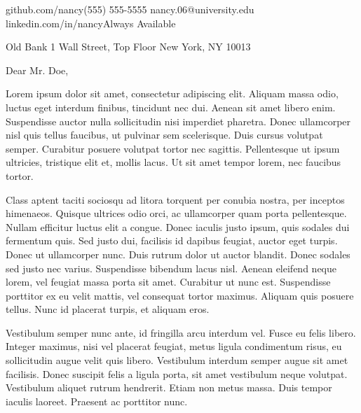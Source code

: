 \documentclass{practical-cover-letter}
\begin{document}
\namehead

\address{nancy.com}{github.com/nancy}{(555) 555-5555}{ nancy.06@university.edu }{linkedin.com/in/nancy}{Always Available}
%
%
\hfill

\begin{changemargin}{.7in}{.7in} 
\employerdate{\today}

\begin{changemargin}{.3in}{.3in} 
{Old Bank}
{1 Wall Street, Top Floor}
{New York, NY 10013}
\end{changemargin}


Dear Mr. Doe,

Lorem ipsum dolor sit amet, consectetur adipiscing elit. Aliquam massa odio, luctus eget interdum finibus, tincidunt nec dui. Aenean sit amet libero enim. Suspendisse auctor nulla sollicitudin nisi imperdiet pharetra. Donec ullamcorper nisl quis tellus faucibus, ut pulvinar sem scelerisque. Duis cursus volutpat semper. Curabitur posuere volutpat tortor nec sagittis. Pellentesque ut ipsum ultricies, tristique elit et, mollis lacus. Ut sit amet tempor lorem, nec faucibus tortor.

Class aptent taciti sociosqu ad litora torquent per conubia nostra, per inceptos himenaeos. Quisque ultrices odio orci, ac ullamcorper quam porta pellentesque. Nullam efficitur luctus elit a congue. Donec iaculis justo ipsum, quis sodales dui fermentum quis. Sed justo dui, facilisis id dapibus feugiat, auctor eget turpis. Donec ut ullamcorper nunc. Duis rutrum dolor ut auctor blandit. Donec sodales sed justo nec varius. Suspendisse bibendum lacus nisl. Aenean eleifend neque lorem, vel feugiat massa porta sit amet. Curabitur ut nunc est. Suspendisse porttitor ex eu velit mattis, vel consequat tortor maximus. Aliquam quis posuere tellus. Nunc id placerat turpis, et aliquam eros.

Vestibulum semper nunc ante, id fringilla arcu interdum vel. Fusce eu felis libero. Integer maximus, nisi vel placerat feugiat, metus ligula condimentum risus, eu sollicitudin augue velit quis libero. Vestibulum interdum semper augue sit amet facilisis. Donec suscipit felis a ligula porta, sit amet vestibulum neque volutpat. Vestibulum aliquet rutrum hendrerit. Etiam non metus massa. Duis tempor iaculis laoreet. Praesent ac porttitor nunc.


\end{changemargin}
\end{document}
